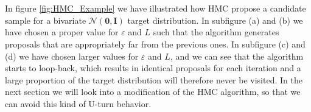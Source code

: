 \\
\\
In figure \ref{fig:HMC_Example} we have illustrated how HMC propose a candidate sample for a bivariate $\mathcal{N}\left(\boldsymbol{0},\boldsymbol{I}\right)$ target distribution. In subfigure (a) and (b) we have chosen a proper value for $\varepsilon$ and $L$ such that the algorithm generates proposals that are appropriately far from the previous ones. In subfigure (c) and (d) we have chosen larger values for $\varepsilon$ and $L$, and we can see that the algorithm starts to loop-back, which results in identical proposals for each iteration and a large proportion of the target distribution will therefore never be visited. In the next section we will look into a modification of the HMC algorithm, so that we can avoid this kind of U-turn behavior.  


